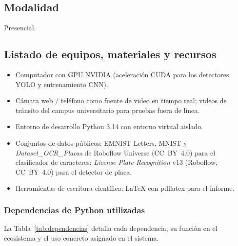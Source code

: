 \documentclass[11pt]{article}
\begin{document}
\subsection{Modalidad}
\begin{tabbing}
    \hspace{1cm} \= Presencial.
\end{tabbing}

\subsection{Listado de equipos, materiales y recursos}
\begin{itemize}
    \item Computador con GPU NVIDIA (aceleración CUDA para los detectores YOLO y
    entrenamiento CNN).
    \item Cámara web / teléfono como fuente de video en tiempo real; videos de tránsito
    del campus universitario para pruebas fuera de línea.
    \item Entorno de desarrollo Python 3.14 con entorno virtual aislado.
    \item Conjuntos de datos públicos: EMNIST Letters, MNIST y
    \emph{Dataset\_OCR\_Placas} de Roboflow Universe (CC~BY~4.0) para el
    clasificador de caracteres; \emph{License Plate Recognition} v13 (Roboflow,
    CC~BY~4.0) para el detector de placa.
    \item Herramientas de escritura científica: \LaTeX{} con pdflatex para el informe.
\end{itemize}

\subsubsection*{Dependencias de Python utilizadas}
La Tabla~\ref{tab:dependencias} detalla cada dependencia, su función en el ecosistema
y el uso concreto asignado en el sistema.
\end{document}
